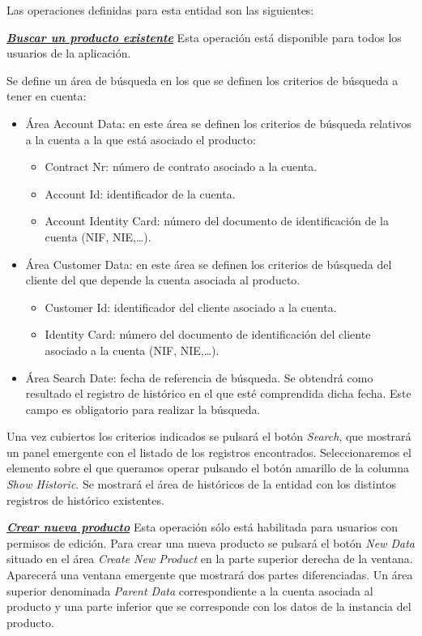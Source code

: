Las operaciones definidas para esta entidad son las siguientes:


\underline{\textsl{\textbf{Buscar un producto existente}}}\newline
Esta operación está disponible para todos los usuarios de la aplicación.

Se define un área de búsqueda en los que se definen los criterios de búsqueda a tener en cuenta:

\begin{itemize}
	\item Área Account Data: en este área se definen los criterios de búsqueda relativos a la cuenta a la que está asociado el producto:
	\begin{itemize}
		\item Contract Nr: número de contrato asociado a la cuenta.
		\item Account Id: identificador de la cuenta.
		\item Account Identity Card: número del documento de identificación de la cuenta (NIF, NIE,\dots).
	\end{itemize}
	\item Área Customer Data: en este área se definen los criterios de búsqueda del cliente del que depende la cuenta asociada al producto.
	\begin{itemize}
		\item Customer Id: identificador del cliente asociado a la cuenta.
		\item Identity Card: número del documento de identificación del cliente asociado a la cuenta (NIF, NIE,\dots).
	\end{itemize}
	\item Área Search Date: fecha de referencia de búsqueda. Se obtendrá como resultado el registro de histórico en el que esté comprendida dicha fecha. Este campo es obligatorio para realizar la búsqueda.
\end{itemize}

Una vez cubiertos los criterios indicados se pulsará el botón \emph{Search}, que mostrará un panel emergente con el listado de los registros encontrados. Seleccionaremos el elemento sobre el que queramos operar pulsando el botón amarillo de la columna \emph{Show Historic}. Se mostrará el área de históricos de la entidad con los distintos registros de histórico existentes.


\underline{\textsl{\textbf{Crear nueva producto}}}\newline
Esta operación sólo está habilitada para usuarios con permisos de edición.
Para crear una nueva producto se pulsará el botón \textit{New Data} situado en el área \emph{Create New Product} en la parte superior derecha de la ventana. Aparecerá una ventana emergente que mostrará dos partes diferenciadas. Un área superior denominada \emph{Parent Data} correspondiente a la cuenta asociada al producto y una parte inferior que se corresponde con los datos de la instancia del producto.

